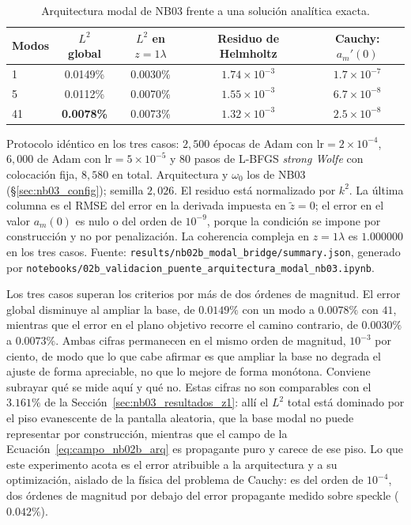 \begin{table}[htbp]
\centering
\begin{threeparttable}
\caption{Arquitectura modal de NB03 frente a una solución analítica exacta.}
\label{tab:nb02b_arquitectura}
\begin{tabular}{lcccc}
\toprule
Modos & $L^2$ global & $L^2$ en $z=1\lambda$ & Residuo de Helmholtz & Cauchy: $a_m'(0)$ \\
\midrule
1  & 0.0149\% & 0.0030\% & $1.74\times10^{-3}$ & $1.7\times10^{-7}$ \\
5  & 0.0112\% & 0.0070\% & $1.55\times10^{-3}$ & $6.7\times10^{-8}$ \\
41 & \textbf{0.0078\%} & 0.0073\% & $1.32\times10^{-3}$ & $2.5\times10^{-8}$ \\
\bottomrule
\end{tabular}
\begin{tablenotes}\small
    \item Protocolo idéntico en los tres casos: $2{,}500$ épocas de Adam con
    $\text{lr}=2\times10^{-4}$, $6{,}000$ de Adam con $\text{lr}=5\times10^{-5}$
    y $80$ pasos de L-BFGS \textit{strong Wolfe} con colocación fija,
    $8{,}580$ en total. Arquitectura y $\omega_0$ los de NB03
    (§\ref{sec:nb03_config}); semilla $2{,}026$. El residuo está normalizado por
    $k^2$. La última columna es el RMSE del error en la derivada impuesta en
    $\tilde z=0$; el error en el valor $a_m(0)$ es nulo o del orden de
    $10^{-9}$, porque la condición se impone por construcción y no por
    penalización. La coherencia compleja en $z=1\lambda$ es $1.000000$ en
    los tres casos. Fuente:
    \texttt{results/nb02b\_modal\_bridge/summary.json}, generado por
    \texttt{notebooks/02b\_validacion\_puente\_arquitectura\_modal\_nb03.ipynb}.
\end{tablenotes}
\end{threeparttable}
\end{table}

Los tres casos superan los criterios por más de dos órdenes de magnitud. El
error global disminuye al ampliar la base, de $0.0149\%$ con un modo a
$0.0078\%$ con $41$, mientras que el error en el plano objetivo recorre el
camino contrario, de $0.0030\%$ a $0.0073\%$. Ambas cifras permanecen en el
mismo orden de magnitud, $10^{-3}$ por ciento, de modo que lo que cabe afirmar
es que ampliar la base no degrada el ajuste de forma apreciable, no que lo
mejore de forma monótona. Conviene
subrayar qué se mide aquí y qué no. Estas cifras no son comparables con el
$3.161\%$ de la Sección~\ref{sec:nb03_resultados_z1}: allí el $L^2$ total está
dominado por el piso evanescente de la pantalla aleatoria, que la base modal no
puede representar por construcción, mientras que el campo de la
Ecuación~\eqref{eq:campo_nb02b_arq} es propagante puro y carece de ese piso. Lo
que este experimento acota es el error atribuible a la arquitectura y a su
optimización, aislado de la física del problema de Cauchy: es del orden de
$10^{-4}$, dos órdenes de magnitud por debajo del error propagante medido sobre
speckle ($0.042\%$).

